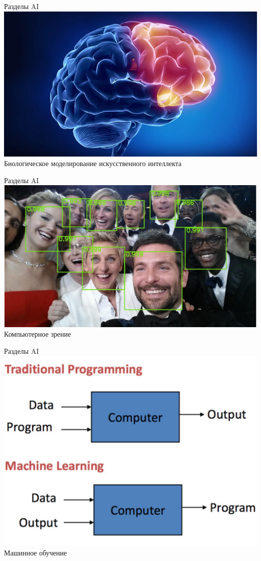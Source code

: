 \documentclass[10pt]{beamer}
\begin{document}
\begin{frame}{Разделы AI}
  \centering
  \includegraphics[width=0.8 \linewidth, height=0.8 \textheight, keepaspectratio]{images/brain}\\
	Биологическое моделирование искусственного интеллекта
\end{frame}

\begin{frame}{Разделы AI}
  \centering
  \includegraphics[width=0.8 \linewidth, height=0.8 \textheight, keepaspectratio]{images/vision}\\
	Компьютерное зрение
\end{frame}

\begin{frame}{Разделы AI}
  \centering
  \includegraphics[width=0.8 \linewidth, height=0.8 \textheight, keepaspectratio]{images/ml}\\
	Машинное обучение
\end{frame}
\end{document}

